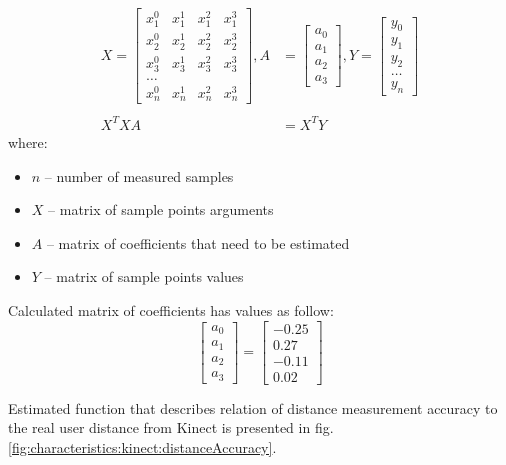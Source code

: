 \documentclass{llncs}
\begin{document}
\begin{equation}
	\begin{split}
		X = 	\begin{bmatrix}
		x_1^0&x_1^1&x_1^2&x_1^3\\			
		x_2^0&x_2^1&x_2^2&x_2^3\\
		x_3^0&x_3^1&x_3^2&x_3^3\\
		\dots\\
		x_n^0&x_n^1&x_n^2&x_n^3
		\end{bmatrix} ,
		A &= 	\begin{bmatrix}
		a_0\\a_1\\a_2\\a_3
		\end{bmatrix} ,
		Y = 
		\begin{bmatrix}
			y_0 \\y_1\\y_2\\\dots\\y_n
		\end{bmatrix} \\
		& \\
		X^TXA &= X^TY
	\end{split}
	\label{eq:polynominal}
\end{equation}
where:
\begin{itemize}
	\item $n$ -- number of measured samples
	\item $X$ -- matrix of sample points arguments
	\item $A$ -- matrix of coefficients that need to be estimated
	\item $Y$ -- matrix of sample points values
\end{itemize}
		
Calculated matrix of coefficients has values as follow:
\begin{equation*}
	\begin{bmatrix}
		a_0 \\a_1\\a_2\\a_3
	\end{bmatrix} = 
	\begin{bmatrix}
		- 0.25 \\  0.27 \\- 0.11\\0.02		
	\end{bmatrix}	
\end{equation*}
		
Estimated function that describes relation of distance measurement accuracy to the real user distance from Kinect is presented in fig. \ref{fig:characteristics:kinect:distanceAccuracy}.
		
\end{document}
